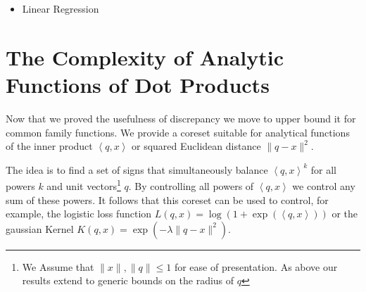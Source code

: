 \documentclass[anon,12pt]{colt2019} %
\newcommand{\ip}[1]{\left \langle #1 \right \rangle}
\newcommand{\eps}{\epsilon}
\begin{document}
\begin{itemize}
\item Linear Regression \cite{DBLP:journals/jmlr/DerezinskiW18}
\end{itemize}




\section{The Complexity of Analytic Functions of Dot Products} \label{sec:analytic}

Now that we proved the usefulness of discrepancy we move to upper bound it for common family functions. We provide a coreset suitable for analytical functions of the inner product $\ip{q,x}$ or squared Euclidean distance $\|q-x\|^2$. 

The idea is to find a set of signs that simultaneously balance $\ip{q,x}^k$ for all powers $k$ and unit vectors\footnote{We Assume that $\|x\|,\|q\| \leq 1$ for ease of presentation. As above our results extend to generic bounds on the radius of $q$} $q$. By controlling all powers of $\ip{q,x}$ we control any sum of these powers. It follows that this coreset can be used to control, for example, the logistic loss function $L(q,x) = \log(1+\exp(\ip{q,x}))$ or the gaussian Kernel $K(q,x) = \exp(-\lambda \|q-x\|^2)$. 
\end{document}

